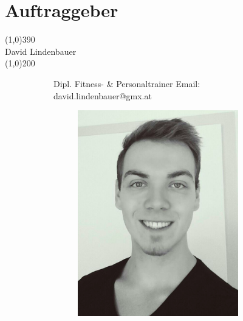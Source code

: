 \documentclass[FIPLY_base.tex]{subfiles}
\begin{document}
	\section{Auftraggeber}
	\line(1,0){390}
	\ \\
	\newline\newline
	{\Large David Lindenbauer}
	\ \\
	\line(1,0){200}
	\begin{figure}[H]
		\begin{subfigure}[b]{0.6\textwidth}
			Dipl. Fitness- \& Personaltrainer
			\newline\newline
			Email: david.lindenbauer@gmx.at
			\newline
			\newline
			\newline
			\newline
			\newline
			\newline
			\newline
			\end{subfigure}
		\begin{subfigure}[b]{0.6\textwidth}
			\begin{subfigure}[b]{0.2\textwidth}
				\includegraphics[scale=0.2]{img/div}
			\end{subfigure}
		\end{subfigure}
	\end{figure}
\end{document}
